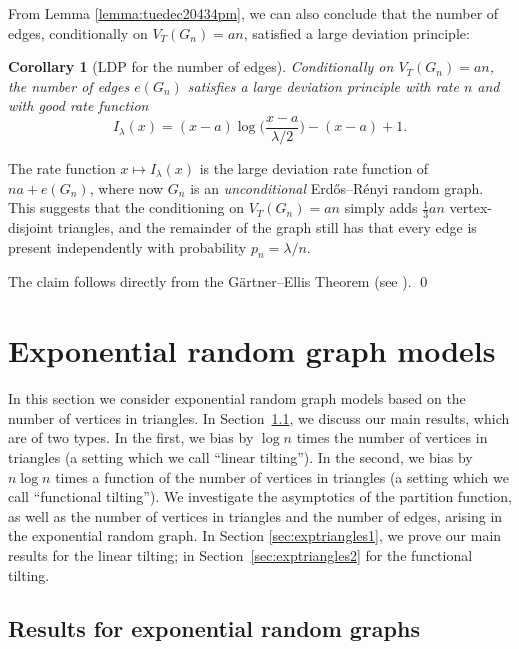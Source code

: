 \documentclass[bj,authoryear,noshowframe]{imsart}
\numberwithin{equation}{section}
\theoremstyle{plain}
\newtheorem{cor}[thm]{Corollary}
\theoremstyle{definition}
\newcommand{\eqn}[1]{\begin{equation}#1\end{equation}}
\newcommand{\erdos}{Erd\H{o}s--R\'enyi random graph}
\begin{document}
From Lemma \ref{lemma:tuedec20434pm}, we can also conclude that the number of edges, conditionally on $V_T(G_n)=an$, satisfied a large deviation principle:
\begin{cor}[LDP for the number of edges]
\label{cor-LDP-edges}
Conditionally on $V_T(G_n)=an$, the number of edges $e(G_n)$ satisfies a large deviation principle with rate $n$ and with good rate function
	\eqn{
	I_\lambda(x)=(x-a)\log\Big(\frac{x-a}{\lambda/2}\Big)-(x-a)+1.
	}
\end{cor}
The rate function $x\mapsto I_\lambda(x)$ is the large deviation rate function of $na+e(G_n)$, where now $G_n$ is an {\em unconditional} \erdos{}. This suggests that the conditioning on $V_T(G_n)=an$ simply adds $\tfrac13 an$ vertex-disjoint triangles, and the remainder of the graph still has that every edge is present independently with probability $p_n=\lambda/n$.

\proof 
The claim follows directly from the G\"artner--Ellis Theorem (see \cite[Theorem 2.3.6]{DemZei98}).
\qed



\section{Exponential random graph models}
\label{sec-ERGs}

In this section we consider exponential random graph models based on the number of vertices in triangles. In Section~\ref{sec-res-ERGs}, we discuss our main results, which are of two types. In the first, we bias by {$\log n$} times the number of vertices in triangles (a setting which we call ``linear tilting''). In the second, we bias by $n \log n$ times a function of the number of vertices in triangles (a setting which we call ``functional tilting''). We investigate the asymptotics of the partition function, as well as the number of vertices in triangles and the number of edges, arising in the exponential random graph. In Section \ref{sec:exptriangles1}, we prove our main results for the linear tilting; in Section~\ref{sec:exptriangles2} for the functional tilting.


\subsection{Results for exponential random graphs}
\label{sec-res-ERGs}

\end{document}
